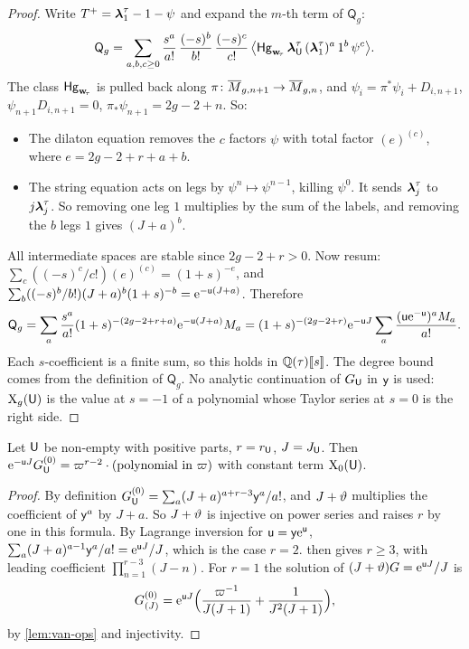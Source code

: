 \begin{proof}
Write $T^{+}=\boldsymbol{\lambda}^{\tau}_1-1-\psi$ and expand the $m$-th term of $\mathsf{Q}_g$:
\[
\mathsf{Q}_g=\sum_{a,b,c\geq 0}\frac{s^a}{a!}\,\frac{(-s)^b}{b!}\,\frac{(-s)^c}{c!}\,\bigl\langle\mathsf{Hg}_{\mathbf{w}_{\!\tau}}\,\boldsymbol{\lambda}^{\tau}_{\mathsf{U}}\,(\boldsymbol{\lambda}^{\tau}_1)^{a}\,1^b\,\psi^c\bigr\rangle.
\]
The class $\mathsf{Hg}_{\mathbf{w}_{\!\tau}}$ is pulled back along $\pi\colon\overline{M}_{g,n+1}\to\overline{M}_{g,n}$, and $\psi_i=\pi^*\psi_i+D_{i,n+1}$, $\psi_{n+1}D_{i,n+1}=0$, $\pi_*\psi_{n+1}=2g-2+n$. So:
\begin{itemize}
\item The dilaton equation removes the $c$ factors $\psi$ with total factor $(e)^{(c)}$, where $e=2g-2+r+a+b$.
\item The string equation acts on legs by $\psi^n\mapsto\psi^{n-1}$, killing $\psi^0$. It sends $\boldsymbol{\lambda}^{\tau}_j$ to $j\boldsymbol{\lambda}^{\tau}_j$. So removing one leg $1$ multiplies by the sum of the labels, and removing the $b$ legs $1$ gives $(J+a)^b$.
\end{itemize}
All intermediate spaces are stable since $2g-2+r>0$. Now resum: $\sum_c((-s)^c/c!)(e)^{(c)}=(1+s)^{-e}$, and $\sum_b((-s)^b/b!)(J+a)^b(1+s)^{-b}=\mathrm{e}^{-\mathsf{u}(J+a)}$. Therefore
\[
\mathsf{Q}_g=\sum_a\frac{s^a}{a!}(1+s)^{-(2g-2+r+a)}\mathrm{e}^{-\mathsf{u}(J+a)}M_a=(1+s)^{-(2g-2+r)}\mathrm{e}^{-\mathsf{u} J}\sum_a\frac{(\mathsf{u}\mathrm{e}^{-\mathsf{u}})^aM_a}{a!}.
\]
Each $s$-coefficient is a finite sum, so this holds in $\mathbb{Q}(\tau)[\![ s ]\!]$. The degree bound comes from the definition of $\mathsf{Q}_g$. No analytic continuation of $G_{\mathsf{U}}$ in $\mathsf{y}$ is used: $\mathrm{X}_g(\mathsf{U})$ is the value at $s=-1$ of a polynomial whose Taylor series at $s=0$ is the right side.
\end{proof}

\begin{lem}\label{lem:van-g0}
Let $\mathsf{U}$ be non-empty with positive parts, $r=r_{\mathsf{U}}$, $J=J_{\mathsf{U}}$. Then $\mathrm{e}^{-\mathsf{u} J}G^{(0)}_{\mathsf{U}}=\varpi^{r-2}\cdot(\text{polynomial in }\varpi)$ with constant term $\mathrm{X}_0(\mathsf{U})$.
\end{lem}

\begin{proof}
By definition $G^{(0)}_{\mathsf{U}}=\sum_a(J+a)^{a+r-3}\mathsf{y}^a/a!$, and $J+\vartheta$ multiplies the coefficient of $\mathsf{y}^a$ by $J+a$. So $J+\vartheta$ is injective on power series and raises $r$ by one in this formula. By Lagrange inversion for $\mathsf{u}=\mathsf{y}\mathrm{e}^{\mathsf{u}}$, $\sum_a(J+a)^{a-1}\mathsf{y}^a/a!=\mathrm{e}^{\mathsf{u} J}/J$, which is the case $r=2$.  then gives $r\geq 3$, with leading coefficient $\prod_{n=1}^{r-3}(J-n)$. For $r=1$ the solution of $(J+\vartheta)G=\mathrm{e}^{\mathsf{u} J}/J$ is
\[
G^{(0)}_{(J)}=\mathrm{e}^{\mathsf{u} J}\Bigl(\frac{\varpi^{-1}}{J(J+1)}+\frac{1}{J^2(J+1)}\Bigr),
\]
by \cref{lem:van-ops} and injectivity.
\end{proof}

